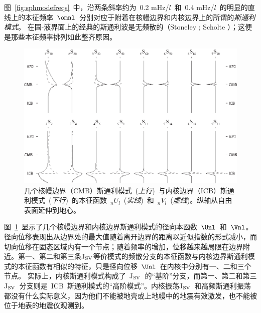 {图~\ref{fig:sphmodefreqs}~中，沿两条斜率约为~0.2 mHz/$l$~和~0.4 mHz/$l$~的明显的直线上的本征频率~$\omnl$~分别对应于附着在核幔边界和内核边界上的所谓的{\em 斯通利模式\/}。
%
%
在固-液界面上的经典的斯通利波是无频散的（Stoneley \citeyear{stoneley24}; Scholte \citeyear{scholte47}）；这便是那些本征频率排列如此整齐原因。
\begin{figure}
\begin{center}
\includegraphics{../figures/chap08/fig15.eps}
\end{center}
\caption[Stoneley]{\label{fig:stoneley}
几个核幔边界（CMB）斯通利模式~({\em 上行\/})~与内核边界（ICB）斯通利模式~({\em 下行\/})~的本征函数~${}_nU_l$~({\em 实线\/})~和~${}_nV_l$~({\em 虚线\/})。纵轴从自由表面延伸到地心。
}
\end{figure}
图~\ref{fig:stoneley}~显示了几个核幔边界和内核边界斯通利模式的径向本函数~$\Unl$~和~$\Vnl$。径向位移表现出从边界处的最大值随着离开边界的距离以近似指数的形式减小，而切向位移在固态区域内有一个节点；随着频率的增加，位移越来越局限在边界附近。第一、第二和第三条J${}_{\rm SV}$等价模式的频散分支的本征函数与内核边界斯通利模式的本征函数有相似的特征，只是径向位移~$\Unl$~在内核中分别有一、二和三个节点。
实际上，内核斯通利模式构成了~J${}_{\rm SV}$~的“基阶”分支，而第一、第二和第三J${}_{\rm SV}$~分支则是~ICB~斯通利模式的“高阶模式”。内核振荡J${}_{\rm SV}$~和高频斯通利振荡都没有什么实际意义，因为他们不能被地壳或上地幔中的地震有效激发，也不能被位于地表的地震仪观测到。

}
